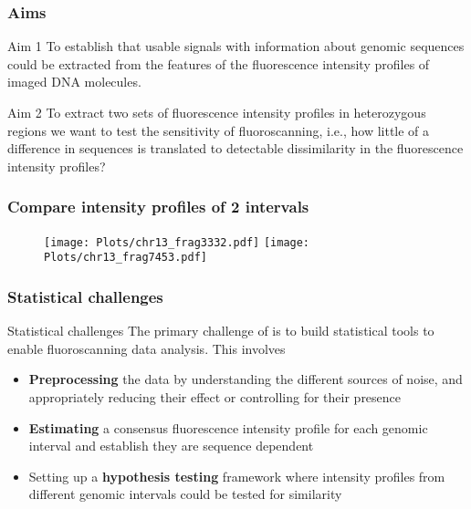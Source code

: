\documentclass[10pt,dvipsnames,table]{beamer}
\begin{document}
\begin{frame}
\frametitle{Aims}
\begin{block}{Aim 1}
To establish that usable signals with information about genomic sequences could be extracted from the features of the fluorescence intensity profiles of imaged DNA molecules.
\end{block}
\vspace{1cm}
\begin{block}{Aim 2}
To extract two sets of fluorescence intensity profiles in heterozygous regions we want to test the sensitivity of fluoroscanning, i.e., how little of a difference in sequences is translated to detectable dissimilarity in the fluorescence intensity profiles?
\end{block}
\end{frame}

\begin{frame}
\frametitle{Compare intensity profiles of 2 intervals}
\begin{figure}[t]
\texttt{[image: Plots/chr13\_frag3332.pdf]}
\texttt{[image: Plots/chr13\_frag7453.pdf]}
\end{figure}
\end{frame}

\begin{frame}
\frametitle{Statistical challenges}
\begin{block}{Statistical challenges}
The primary challenge of is to build statistical tools to enable fluoroscanning data analysis. This involves
\begin{itemize}
\item {\bf{Preprocessing}} the data by understanding the different sources of noise, and appropriately reducing their effect or controlling for their presence
\item {\bf{Estimating}} a consensus fluorescence intensity profile for each genomic interval and establish they are sequence dependent
\item Setting up a {\bf{hypothesis testing}} framework where intensity profiles from different genomic intervals could be tested for similarity
\end{itemize}
\end{block}
\end{frame}
\end{document}
